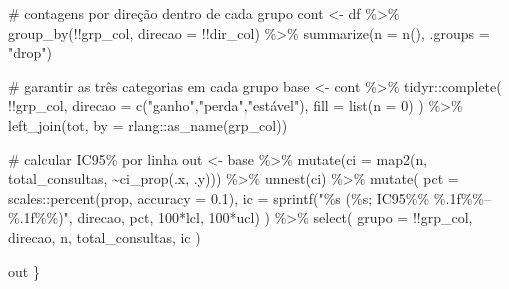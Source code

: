 \documentclass[
]{article}
\newenvironment{Shaded}{\begin{snugshade}}{\end{snugshade}}
\newcommand{\AttributeTok}[1]{\textcolor[rgb]{0.40,0.45,0.13}{#1}}
\newcommand{\CommentTok}[1]{\textcolor[rgb]{0.37,0.37,0.37}{#1}}
\newcommand{\DecValTok}[1]{\textcolor[rgb]{0.68,0.00,0.00}{#1}}
\newcommand{\FloatTok}[1]{\textcolor[rgb]{0.68,0.00,0.00}{#1}}
\newcommand{\FunctionTok}[1]{\textcolor[rgb]{0.28,0.35,0.67}{#1}}
\newcommand{\NormalTok}[1]{\textcolor[rgb]{0.00,0.23,0.31}{#1}}
\newcommand{\OtherTok}[1]{\textcolor[rgb]{0.00,0.23,0.31}{#1}}
\newcommand{\SpecialCharTok}[1]{\textcolor[rgb]{0.37,0.37,0.37}{#1}}
\newcommand{\StringTok}[1]{\textcolor[rgb]{0.13,0.47,0.30}{#1}}
\begin{document}
\begin{Shaded}
\begin{Highlighting}[]
  \CommentTok{\# contagens por direção dentro de cada grupo}
\NormalTok{  cont }\OtherTok{\textless{}{-}}\NormalTok{ df }\SpecialCharTok{\%\textgreater{}\%}
    \FunctionTok{group\_by}\NormalTok{(}\SpecialCharTok{!!}\NormalTok{grp\_col, }\AttributeTok{direcao =} \SpecialCharTok{!!}\NormalTok{dir\_col) }\SpecialCharTok{\%\textgreater{}\%}
    \FunctionTok{summarize}\NormalTok{(}\AttributeTok{n =} \FunctionTok{n}\NormalTok{(), }\AttributeTok{.groups =} \StringTok{"drop"}\NormalTok{)}

  \CommentTok{\# garantir as três categorias em cada grupo}
\NormalTok{  base }\OtherTok{\textless{}{-}}\NormalTok{ cont }\SpecialCharTok{\%\textgreater{}\%}
\NormalTok{    tidyr}\SpecialCharTok{::}\FunctionTok{complete}\NormalTok{(}
      \SpecialCharTok{!!}\NormalTok{grp\_col,}
      \AttributeTok{direcao =} \FunctionTok{c}\NormalTok{(}\StringTok{"ganho"}\NormalTok{,}\StringTok{"perda"}\NormalTok{,}\StringTok{"estável"}\NormalTok{),}
      \AttributeTok{fill =} \FunctionTok{list}\NormalTok{(}\AttributeTok{n =} \DecValTok{0}\NormalTok{)}
\NormalTok{    ) }\SpecialCharTok{\%\textgreater{}\%}
    \FunctionTok{left\_join}\NormalTok{(tot, }\AttributeTok{by =}\NormalTok{ rlang}\SpecialCharTok{::}\FunctionTok{as\_name}\NormalTok{(grp\_col))}

  \CommentTok{\# calcular IC95\% por linha}
\NormalTok{  out }\OtherTok{\textless{}{-}}\NormalTok{ base }\SpecialCharTok{\%\textgreater{}\%}
    \FunctionTok{mutate}\NormalTok{(}\AttributeTok{ci =} \FunctionTok{map2}\NormalTok{(n, total\_consultas, }\SpecialCharTok{\textasciitilde{}}\FunctionTok{ci\_prop}\NormalTok{(.x, .y))) }\SpecialCharTok{\%\textgreater{}\%}
    \FunctionTok{unnest}\NormalTok{(ci) }\SpecialCharTok{\%\textgreater{}\%}
    \FunctionTok{mutate}\NormalTok{(}
      \AttributeTok{pct =}\NormalTok{ scales}\SpecialCharTok{::}\FunctionTok{percent}\NormalTok{(prop, }\AttributeTok{accuracy =} \FloatTok{0.1}\NormalTok{),}
      \AttributeTok{ic  =} \FunctionTok{sprintf}\NormalTok{(}\StringTok{"\%s (\%s; IC95\%\% \%.1f\%\%–\%.1f\%\%)"}\NormalTok{, direcao, pct, }\DecValTok{100}\SpecialCharTok{*}\NormalTok{lcl, }\DecValTok{100}\SpecialCharTok{*}\NormalTok{ucl)}
\NormalTok{    ) }\SpecialCharTok{\%\textgreater{}\%}
    \FunctionTok{select}\NormalTok{(}
      \AttributeTok{grupo =} \SpecialCharTok{!!}\NormalTok{grp\_col,}
\NormalTok{      direcao, n, total\_consultas, ic}
\NormalTok{    )}

\NormalTok{  out}
\NormalTok{\}}


\end{Highlighting}
\end{Shaded}
\end{document}
